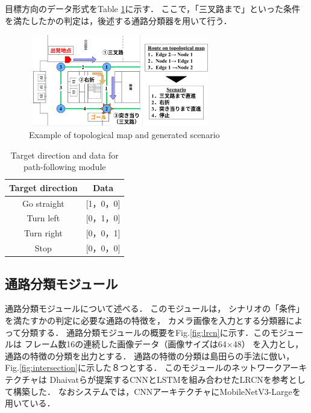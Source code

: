 \documentclass{sice-si}
\begin{document}
目標方向のデータ形式をTable \ref{tab:target}に示す．
ここで，「三叉路まで」といった条件を満たしたかの判定は，後述する通路分類器を用いて行う．
\begin{figure}[htbp]
    \centering
     \includegraphics[height=40mm,width=80mm]{./figs/topo2sce.pdf}
     \caption{Example of topological map and generated scenario}\label{fig:topo2sce}
\end{figure}
\begin{table}[]
    \centering
    \caption{Target direction and data for path-following module}\label{tab:target}
    \begin{tabular}{|c|c|}
    \hline
    Target direction & Data        \\
    \hline
    Go straight   & {[}1，0，0{]} \\
    Turn left   & {[}0，1，0{]} \\
    Turn right   & {[}0，0，1{]} \\
    Stop   & {[}0，0，0{]}\\
    \hline
    \end{tabular}
    \end{table}

\subsection{通路分類モジュール}
通路分類モジュールについて述べる．
このモジュールは，
シナリオの「条件」を満たすかの判定に必要な通路の特徴を，
カメラ画像を入力とする分類器によって分類する．
通路分類モジュールの概要をFig.\ref{fig:lrcn}に示す．このモジュールは
フレーム数16の連続した画像データ（画像サイズは64×48）
を入力とし，通路の特徴の分類を出力とする．
通路の特徴の分類は島田らの手法\cite{shimada2020}に倣い，
Fig.\ref{fig:intersection}に示した８つとする．
このモジュールのネットワークアーキテクチャは
Dhaivatらが提案するCNNとLSTMを組み合わせたLRCN\cite{lrcn}を参考として構築した．
なおシステムでは，CNNアーキテクチャにMobileNetV3-Large\cite{v3}を用いている．
\end{document}
